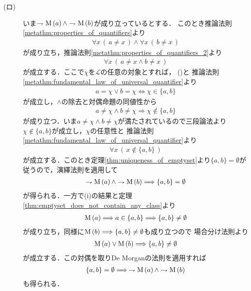 \begin{prf}
\begin{description}
			\item[(ロ)]
				いま$\rightharpoondown \operatorname*{M}\left(a\right) \wedge \rightharpoondown \operatorname*{M}\left(b\right)$が成り立っているとする．
				このとき推論法則\ref{metathm:properties_of_quantifiers}より
				\begin{align}
					\forall x\, (\, a \neq x\, ) \wedge \forall x\, (\, b \neq x\, )
				\end{align}
				が成り立ち，推論法則\ref{metathm:properties_of_quantifiers_2}より
				\begin{align}
					\forall x\, (\, a \neq x \wedge b \neq x\, )
				\end{align}
				が成立する．ここで$\chi$を$\mathcal{L}$の任意の対象とすれば，
				()と
				推論法則\ref{metathm:fundamental_law_of_universal_quantifier}より
				\begin{align}
					a = \chi \vee b = \chi \Longleftrightarrow \chi \in \{a,b\}
				\end{align}
				が成立し，$\wedge$の除去と対偶命題の同値性から
				\begin{align}
					a \neq \chi \wedge b \neq \chi \Longrightarrow \chi \notin \{a,b\}
				\end{align}
				が成り立つ．いま$a \neq \chi \wedge b \neq \chi$が満たされているので三段論法より
				$\chi \notin \{a,b\}$が成立し，$\chi$の任意性と
				推論法則\ref{metathm:fundamental_law_of_universal_quantifier}より
				\begin{align}
					\forall x\, (\, x \notin \{a,b\}\, )
				\end{align}
				が成立する．このとき定理\ref{thm:uniqueness_of_emptyset}より$\{a,b\} = \emptyset$が従うので，演繹法則を適用して
				\begin{align}
					\rightharpoondown \operatorname*{M}\left(a\right) \wedge \rightharpoondown \operatorname*{M}\left(b\right) \Longrightarrow \{a,b\} = \emptyset
				\end{align}
				が得られる．一方で(i)の結果と定理\ref{thm:emptyset_does_not_contain_any_class}より
				\begin{align}
					\operatorname*{M}\left(a\right) \Longrightarrow a \in \{a,b\} \Longrightarrow \{a,b\} \neq \emptyset
				\end{align}
				が成り立ち，同様に$\operatorname*{M}\left(b\right) \Longrightarrow \{a,b\} \neq \emptyset$も成り立つので
				場合分け法則より
				\begin{align}
					\operatorname*{M}\left(a\right) \vee \operatorname*{M}\left(b\right) \Longrightarrow \{a,b\} \neq \emptyset
				\end{align}
				が成立する．この対偶を取りDe Morganの法則を適用すれば
				\begin{align}
					\{a,b\} = \emptyset \Longrightarrow\, \rightharpoondown \operatorname*{M}\left(a\right) \wedge \rightharpoondown \operatorname*{M}\left(b\right)
				\end{align}
				も得られる．
				\QED
		\end{description}
	\end{prf}
	
